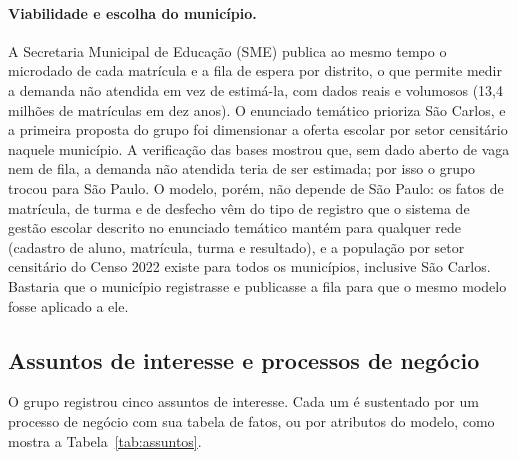 \documentclass[11pt,a4paper]{article}
\begin{document}
\paragraph{Viabilidade e escolha do município.} A Secretaria Municipal de Educação (SME) publica ao mesmo tempo o microdado de cada matrícula e a fila de espera por distrito, o que permite medir a demanda não atendida em vez de estimá-la, com dados reais e volumosos (13,4 milhões de matrículas em dez anos). O enunciado temático prioriza São Carlos, e a primeira proposta do grupo foi dimensionar a oferta escolar por setor censitário naquele município. A verificação das bases mostrou que, sem dado aberto de vaga nem de fila, a demanda não atendida teria de ser estimada; por isso o grupo trocou para São Paulo. O modelo, porém, não depende de São Paulo: os fatos de matrícula, de turma e de desfecho vêm do tipo de registro que o sistema de gestão escolar descrito no enunciado temático mantém para qualquer rede (cadastro de aluno, matrícula, turma e resultado), e a população por setor censitário do Censo 2022 existe para todos os municípios, inclusive São Carlos. Bastaria que o município registrasse e publicasse a fila para que o mesmo modelo fosse aplicado a ele.

\subsection{Assuntos de interesse e processos de negócio}

O grupo registrou cinco assuntos de interesse. Cada um é sustentado por um processo de negócio com sua tabela de fatos, ou por atributos do modelo, como mostra a Tabela~\ref{tab:assuntos}.
\end{document}
